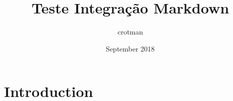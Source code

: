 \documentclass{article}
\title{Teste Integração Markdown}
\author{crotman }
\date{September 2018}
\begin{document}
\maketitle

\section{Introduction}
\end{document}
